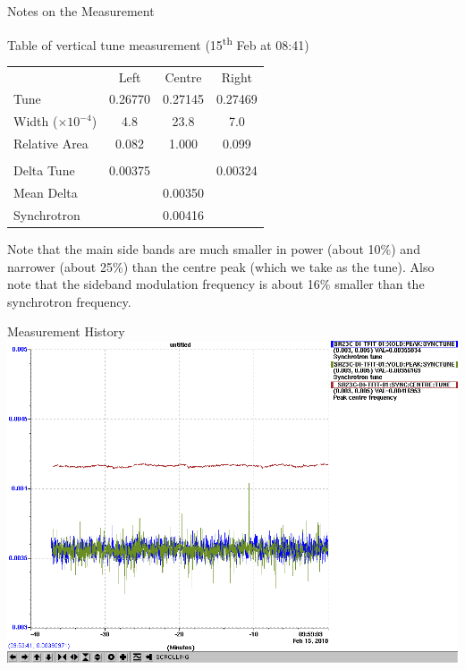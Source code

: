 \documentclass[xcolor=table]{beamer}
\newcommand{\cc}{\cellcolor{green!60!blue!20}}
\begin{document}
%
\begin{frame}{Notes on the Measurement}

Table of vertical tune measurement (15\textsuperscript{th} Feb at 08:41)
\medskip

\begin{tabular}{lccc}
 & \cc Left & \cc Centre & \cc Right \\
\cc Tune & 0.26770 & 0.27145 & 0.27469 \\
\cc Width ($\times10^{-4}$) & 4.8 & 23.8 & 7.0 \\
\cc Relative Area & 0.082 & 1.000 & 0.099 \\
\\
\cc Delta Tune & 0.00375 & & 0.00324 \\
\cc Mean Delta & & 0.00350 \\
\cc Synchrotron & & 0.00416 \\
\end{tabular}

\bigskip

Note that the main side bands are much smaller in power (about 10\%) and
narrower (about 25\%) than the centre peak (which we take as the tune).  Also
note that the sideband modulation frequency is about 16\% smaller than the
synchrotron frequency.

\end{frame}


%
\begin{frame}{Measurement History}
\includegraphics[width=\linewidth]{strip.png}
\end{frame}
\end{document}
